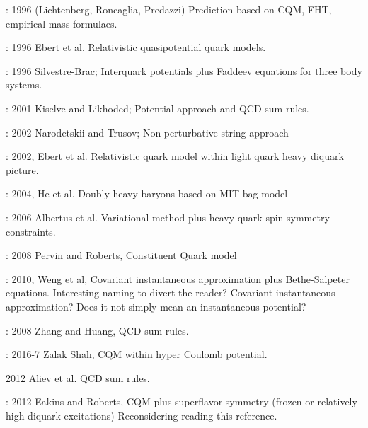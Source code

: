 \documentclass[showkeys,aps,10pt,twocolumn,showpacs,preprintnumbers,amsmath,amssymb,prd,letterpaper,floatfix,nofootinbib,superscriptaddress,]{revtex4-1}
\begin{document}
\item[] \cite{Lichtenberg:1995kg} : 1996 (Lichtenberg, Roncaglia, Predazzi) Prediction based on CQM, FHT, empirical mass formulaes. 

\item[] \cite{Ebert:1996ec} : 1996 Ebert et al. Relativistic quasipotential quark models.

\item[] \cite{SilvestreBrac:1996wp} : 1996 Silvestre-Brac; Interquark potentials plus Faddeev equations for three body systems. 

\item[] \cite{Kiselev:2001fw} : 2001 Kiselve and Likhoded; Potential approach and QCD sum rules. 

\item[] \cite{Narodetskii:2002ib} : 2002 Narodetskii and Trusov; Non-perturbative string approach

\item[] \cite{Ebert:2002ig} : 2002, Ebert et al. Relativistic quark model within light quark heavy diquark picture. 
 
\item[] \cite{He:2004px} : 2004, He et al. Doubly heavy baryons based on MIT bag model 

\item[] \cite{Albertus:2006ya} : 2006 Albertus et al. Variational method plus heavy quark spin symmetry constraints. 

\item[] \cite{Roberts:2007ni} : 2008 Pervin and Roberts, Constituent Quark model 

\item[] \cite{Weng:2010rb} : 2010, Weng et al, Covariant instantaneous approximation plus Bethe-Salpeter equations.
                               Interesting naming to divert the reader? Covariant instantaneous approximation? 
                               Does it not simply mean an instantaneous potential?

\item[] \cite{Zhang:2008rt,Zhang:2009re} : 2008 Zhang and Huang, QCD sum rules. 

\item[] \cite{Shah:2016vmd,Shah:2017liu} : 2016-7 Zalak Shah, CQM within hyper Coulomb potential.

\item[] \cite{Aliev:2012ru,Aliev:2012iv} 2012 Aliev et al. QCD sum rules. 

\item[] \cite{Eakins:2012jk} : 2012 Eakins and Roberts, CQM plus superflavor symmetry (frozen or relatively high diquark excitations)
                               Reconsidering reading this reference.
\end{document}
